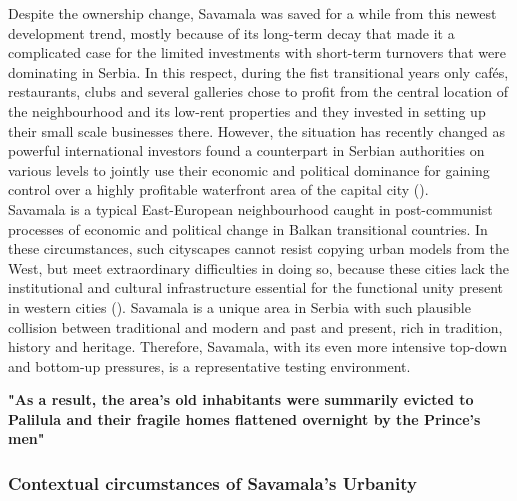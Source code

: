 \documentclass[11pt]{report}
\begin{document}
Despite the ownership change, Savamala was saved for a while from this newest development trend, mostly because of its long-term decay that made it a complicated case for the limited investments with short-term turnovers that were dominating in Serbia.
In this respect, during the fist transitional years only cafés, restaurants, clubs and several galleries chose to profit from the central location of the neighbourhood and its low-rent properties and they invested in setting up their small scale businesses there.
However, the situation has recently changed as powerful international investors found a counterpart in Serbian authorities on various levels to jointly use their economic and political dominance for gaining control over a highly profitable waterfront area of the capital city (\cite{Zekovic et al., 2016}).
\\
Savamala is a typical East-European neighbourhood caught in post-communist processes of economic and political change in Balkan transitional countries.
In these circumstances, such cityscapes cannot resist copying urban models from the West, but meet extraordinary difficulties in doing so, because these cities lack the institutional and cultural infrastructure essential for the functional unity present in western cities (\href{ref}{\citealt{petrovic_cities_2009}}).
Savamala is a unique area in Serbia with such plausible collision between traditional and modern and past and present, rich in tradition, history and heritage.
Therefore, Savamala, with its even more intensive top-down and bottom-up pressures, is a representative testing environment.

\textbf{"As a result, the area's old inhabitants were summarily evicted to Palilula  and their fragile homes flattened overnight by the Prince's men" \cite{bureau savamala}}

\subsubsection{Contextual circumstances of Savamala's Urbanity}
\end{document}
